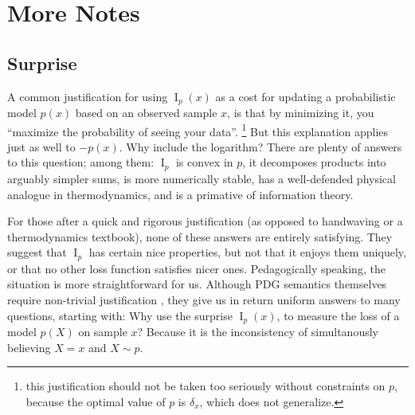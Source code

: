 \documentclass[twoside]{article}
\theoremstyle{plain}
\theoremstyle{definition}
\DeclareMathOperator{\I}{\mathrm{I}} %
\begin{document}
\section{More Notes}
\subsection{Surprise}
A common justification for using $\I_p(x)$ as a cost for updating a probabilistic model $p(x)$ based on an observed sample $x$, is that by minimizing it, you  ``maximize the probability of seeing your data''.%
%
 	\footnote{this justification should not be taken too seriously  without constraints on $p$, because the optimal value of $p$  is $\delta_x$, which does not generalize.}
But this explanation applies just as well to $-p(x)$. Why include the logarithm?
There are plenty of answers to this question; among them: $\I_p$ is convex in $p$, it decomposes products into arguably simpler sums, is more numerically stable, has a well-defended physical analogue in thermodynamics, and is a primative of information theory.

For those after a quick and rigorous justification (as opposed to handwaving or a thermodynamics textbook), none of these answers are entirely satisfying.
They suggest that $\I_p$ has certain nice properties, but not that it enjoys them uniquely, or that no other loss function satisfies nicer ones.
Pedagogically speaking, the situation is more straightforward for us.
Although PDG semantics themselves require non-trivial justification%
, they give us in return uniform answers to many questions, starting with:
Why use the surprise $\I_p(x)$, to measure the loss of a model $p(X)$ on sample $x$? Because it is the inconsistency of simultanously believing $X = x$ and $X \sim p$.
\end{document}
